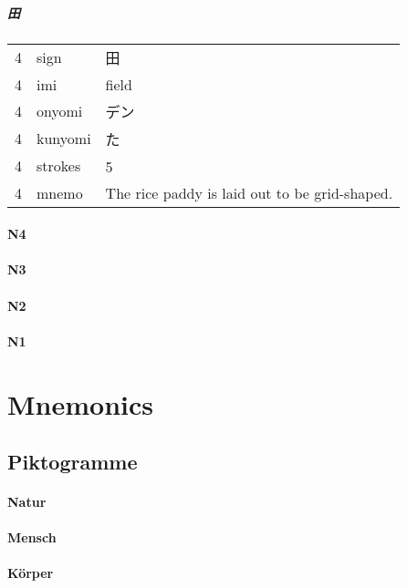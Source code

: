 \documentclass[justified, a4paper, notitlepage, captions=tableheading, nobib]{tufte-handout}
\begin{document}
\subparagraph{田}
\label{sec:orgd3d1895}

\label{tab:org546a367}
\begin{tabular}{rll}
4 & sign & 田\\
4 & imi & field\\
4 & onyomi & デン\\
4 & kunyomi & た\\
4 & strokes & 5　\\
4 & mnemo & The rice paddy is laid out to be grid-shaped.\\
\end{tabular}

\paragraph{N4}
\label{sec:org7adefa7}
\paragraph{N3}
\label{sec:org22537f4}
\paragraph{N2}
\label{sec:orgf5d03d8}
\paragraph{N1}
\label{sec:org35d6e0b}
\newpage
\section{Mnemonics}
\label{sec:org292c42a}

\subsection{Piktogramme}
\label{sec:org8bf4d0a}

\paragraph{Natur}
\label{sec:org0794732}

\paragraph{Mensch}
\label{sec:orge07f693}

\paragraph{Körper}
\label{sec:orga514cbb}
\end{document}
